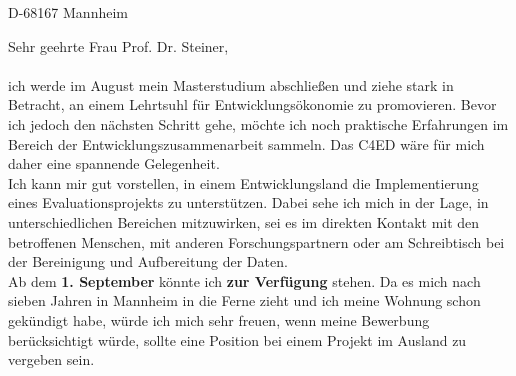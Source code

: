 \documentclass{mycv}
\begin{document}
\address{Lange Rötterstraße 110}{D-68167 Mannheim}

\vspace{1cm}


\vspace{1cm}

Sehr geehrte Frau Prof. Dr. Steiner,\\\\

ich werde im August mein Masterstudium abschließen und ziehe stark in Betracht, an einem Lehrtsuhl für Entwicklungsökonomie zu promovieren. Bevor ich jedoch den nächsten Schritt gehe, möchte ich noch praktische Erfahrungen im Bereich der Entwicklungszusammenarbeit sammeln. Das C4ED wäre für mich daher eine spannende Gelegenheit.\\

Ich kann mir gut vorstellen, in einem Entwicklungsland die Implementierung eines Evaluationsprojekts zu unterstützen. Dabei sehe ich mich in der Lage, in unterschiedlichen Bereichen mitzuwirken, sei es im direkten Kontakt mit den betroffenen Menschen, mit anderen Forschungspartnern oder am Schreibtisch bei der Bereinigung und Aufbereitung der Daten.\\

Ab dem \textbf{1. September} könnte ich \textbf{zur Verfügung} stehen. Da es mich nach sieben Jahren in Mannheim in die Ferne zieht und ich meine Wohnung schon gekündigt habe, würde ich mich sehr freuen, wenn meine Bewerbung berücksichtigt würde, sollte eine Position bei einem Projekt im Ausland zu vergeben sein.



\end{document}
